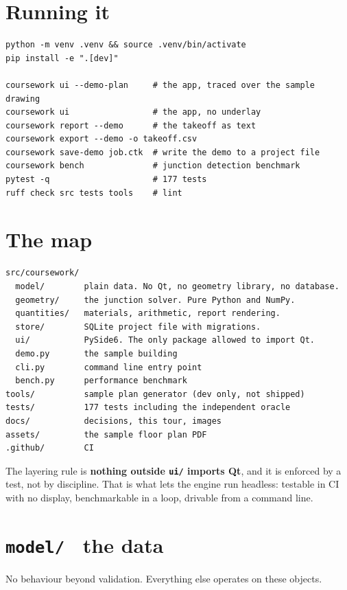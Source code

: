 \documentclass[11pt,letterpaper]{article}
\newcommand{\code}[1]{\texttt{\small #1}}
\begin{document}
\section{Running it}

\begin{lstlisting}[language=none]
python -m venv .venv && source .venv/bin/activate
pip install -e ".[dev]"

coursework ui --demo-plan     # the app, traced over the sample drawing
coursework ui                 # the app, no underlay
coursework report --demo      # the takeoff as text
coursework export --demo -o takeoff.csv
coursework save-demo job.ctk  # write the demo to a project file
coursework bench              # junction detection benchmark
pytest -q                     # 177 tests
ruff check src tests tools    # lint
\end{lstlisting}

\section{The map}

\begin{lstlisting}[language=none]
src/coursework/
  model/        plain data. No Qt, no geometry library, no database.
  geometry/     the junction solver. Pure Python and NumPy.
  quantities/   materials, arithmetic, report rendering.
  store/        SQLite project file with migrations.
  ui/           PySide6. The only package allowed to import Qt.
  demo.py       the sample building
  cli.py        command line entry point
  bench.py      performance benchmark
tools/          sample plan generator (dev only, not shipped)
tests/          177 tests including the independent oracle
docs/           decisions, this tour, images
assets/         the sample floor plan PDF
.github/        CI
\end{lstlisting}

The layering rule is \textbf{nothing outside \code{ui/} imports Qt}, and it
is enforced by a test, not by discipline. That is what lets the engine run
headless: testable in CI with no display, benchmarkable in a loop, drivable
from a command line.

\section{\texttt{model/} \textendash\ the data}

No behaviour beyond validation. Everything else operates on these objects.
\end{document}

